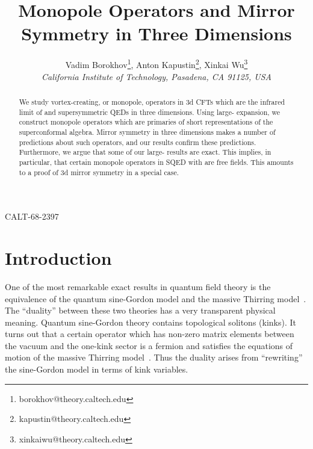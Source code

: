\documentclass[a4paper,12pt, amsfonts, amssymb]{article}
\title{\bf \Large Monopole Operators and Mirror Symmetry in Three Dimensions}
\author{Vadim Borokhov\thanks{borokhov@theory.caltech.edu}, Anton Kapustin\thanks{kapustin@theory.caltech.edu}, Xinkai Wu\thanks{xinkaiwu@theory.caltech.edu}\\
\it California Institute of Technology, Pasadena, CA 91125, USA
}
\begin{document}
\begin{titlepage}

\renewcommand{\thepage}{ }

\maketitle

\begin{abstract}

We study vortex-creating, or monopole, operators in 3d CFTs which
are the infrared limit of \coordHE{} and \coordHE{} supersymmetric QEDs in
three dimensions. Using large-\coordHE{} expansion, we construct monopole 
operators which are primaries of short representations of the superconformal
algebra. Mirror symmetry in three dimensions makes a number of predictions about such operators, and our results confirm these predictions. Furthermore,
we argue that some of our large-\coordHE{} results are exact. This implies, in particular, that certain monopole operators in \coordHE{}  \coordHE{} SQED with \coordHE{} are free fields. This amounts to a proof of 3d mirror symmetry in a special case.

\end{abstract}

\vspace{-6.5in}

\parbox{\linewidth}
{\small\hfill CALT-68-2397}

\end{titlepage}


\section{Introduction}

One of the most remarkable exact results in quantum field theory is the
equivalence of the quantum sine-Gordon model and the massive Thirring
model~\cite{Coleman,Mandelstam}. The ``duality'' between these two
theories has a very transparent physical meaning. Quantum sine-Gordon 
theory contains topological solitons (kinks). It turns out that
a certain operator which has non-zero matrix elements between the vacuum
and the one-kink sector is a fermion and satisfies the equations of
motion of the massive Thirring model~\cite{Mandelstam}. Thus
the duality arises from ``rewriting'' the sine-Gordon model in terms
of kink variables. 
\end{document}
